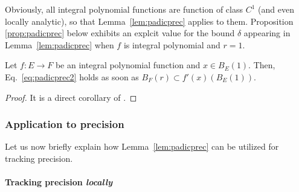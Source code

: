 \documentclass{article}
\begin{document}
Obviously, all integral polynomial functions are function of class $C^1$ 
(and even locally analytic), so that Lemma~\ref{lem:padicprec} applies 
to them. Proposition \ref{prop:padicprec} below exhibits an explcit 
value for the bound $\delta$ appearing in Lemma~\ref{lem:padicprec} when 
$f$ is integral polynomial and $r=1$.

\begin{prop}
\label{prop:padicprec}
Let $f : E \to F$ be an integral polynomial function and $x \in B_E(1)$. 
Then, Eq.~\eqref{eq:padicprec2} holds as soon as 
$B_F(r) \subset f'(x)(B_E(1))$.
\end{prop}

\begin{proof}
It is a direct corollary of \cite[Proposition 3.12]{padicprec}.
\end{proof}

\subsubsection{Application to precision}

Let us now briefly explain how Lemma~\ref{lem:padicprec} can be utilized 
for tracking precision.

\paragraph{Tracking precision \emph{locally}}
\end{document}
